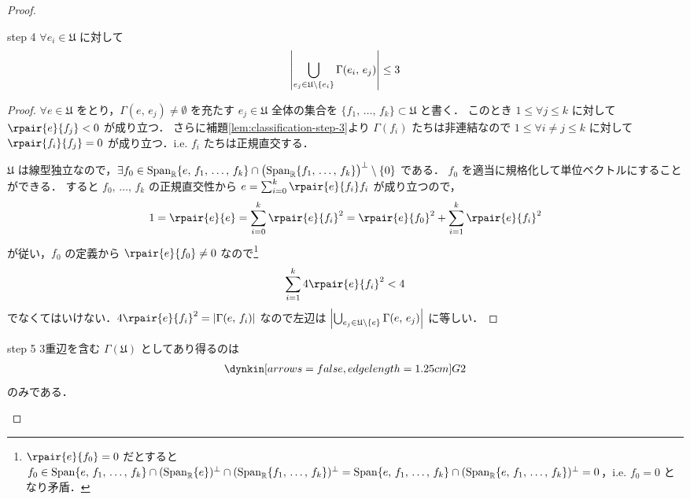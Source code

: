 \documentclass[rep_main]{subfiles}
\begin{document}
\begin{proof}
	\begin{mylem}[label=lem:classification-step-4]{step 4}
		$\forall e_i \in \mathfrak{U}$ に対して
		\begin{align}
			\abs{\bigcup_{e_j \in \mathfrak{U} \setminus \{e_i\}} \Gamma(e_i,\, e_j)} \le 3
		\end{align}
	\end{mylem}
	
	\begin{proof}
		$\forall e \in \mathfrak{U}$ をとり，$\Gamma(e,\, e_j) \neq \emptyset$ を充たす $e_j \in \mathfrak{U}$ 全体の集合を $\{f_1,\, \dots,\, f_k\} \subset \mathfrak{U}$ と書く．
		このとき $1 \le \forall j \le k$ に対して $\rpair{e}{f_j} < 0$ が成り立つ．
		さらに補題\ref{lem:classification-step-3}より $\Gamma(f_i)$ たちは非連結なので $1 \le \forall i \neq j \le k$ に対して $\rpair{f_i}{f_j} = 0$ が成り立つ．i.e. $f_i$ たちは正規直交する．

		$\mathfrak{U}$ は線型独立なので，$\exists f_0 \in \operatorname{Span}_{\mathbb{R}} \{e,\, f_1,\, \dots,\, f_k\} \cap \bigl(\operatorname{Span}_{\mathbb{R}} \{f_1,\, \dots,\, f_k\}\bigr)^\perp \setminus \{0\}$ である．
		$f_0$ を適当に規格化して単位ベクトルにすることができる． 
		すると $f_0,\, \dots,\, f_k$ の正規直交性から $e = \sum_{i=0}^k \rpair{e}{f_i} f_i$ が成り立つので，
		\begin{align}
			1 = \rpair{e}{e} = \sum_{i=0}^k \rpair{e}{f_i}^2 = \rpair{e}{f_0}^2 + \sum_{i=1}^k \rpair{e}{f_i}^2
		\end{align}
		が従い，$f_0$ の定義から $\rpair{e}{f_0} \neq 0$ なので\footnote{$\rpair{e}{f_0} = 0$ だとすると $f_0 \in \operatorname{Span}\{e,\, f_1,\, \dots,\, f_k\} \cap (\operatorname{Span}_{\mathbb{R}}\{e\})^\perp \cap (\operatorname{Span}_{\mathbb{R}}\{f_1,\, \dots,\, f_k\})^\perp = \operatorname{Span}\{e,\, f_1,\, \dots,\, f_k\} \cap (\operatorname{Span}_{\mathbb{R}}\{e,\, f_1,\, \dots,\, f_k\})^\perp = 0$，i.e. $f_0 = 0$ となり矛盾．}
		\begin{align}
			\sum_{i=1}^k 4\rpair{e}{f_i}^2 < 4
		\end{align}
		でなくてはいけない．$4\rpair{e}{f_i}^2 = \abs{\Gamma(e,\, f_i)}$ なので左辺は
		$\abs{\bigcup_{e_j \in \mathfrak{U} \setminus \{e\}} \Gamma(e,\, e_j)}$ に等しい．
	\end{proof}

	\begin{mylem}[label=lem:classification-step-5]{step 5}
		3重辺を含む $\Gamma(\mathfrak{U})$ としてあり得るのは
		\begin{align}
			\dynkin[arrows=false,edge length=1.25cm]G2
		\end{align}
		のみである．
	\end{mylem}
	

\end{proof}
\end{document}
